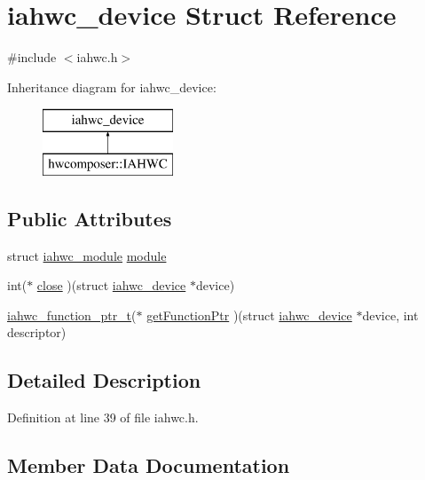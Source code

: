 \hypertarget{structiahwc__device}{}\section{iahwc\+\_\+device Struct Reference}
\label{structiahwc__device}


{\ttfamily \#include $<$iahwc.\+h$>$}

Inheritance diagram for iahwc\+\_\+device\+:\begin{figure}[H]
\begin{center}
\leavevmode
\includegraphics[height=2.000000cm]{structiahwc__device}
\end{center}
\end{figure}
\subsection*{Public Attributes}
\begin{DoxyCompactItemize}
\item 
struct \mbox{\hyperlink{structiahwc__module}{iahwc\+\_\+module}} \mbox{\hyperlink{structiahwc__device_a0aefc811fc58971ae303276df5fec646}{module}}
\item 
int($\ast$ \mbox{\hyperlink{structiahwc__device_a147ff8b5cced2b745222742c89fd3e08}{close}} )(struct \mbox{\hyperlink{structiahwc__device}{iahwc\+\_\+device}} $\ast$device)
\item 
\mbox{\hyperlink{iahwc_8h_a214bf51cce821fdb7b24210088c12cad}{iahwc\+\_\+function\+\_\+ptr\+\_\+t}}($\ast$ \mbox{\hyperlink{structiahwc__device_af5514f45ede1ab95ab6eafa8c3f40ad3}{get\+Function\+Ptr}} )(struct \mbox{\hyperlink{structiahwc__device}{iahwc\+\_\+device}} $\ast$device, int descriptor)
\end{DoxyCompactItemize}


\subsection{Detailed Description}


Definition at line 39 of file iahwc.\+h.



\subsection{Member Data Documentation}
\mbox{\label{structiahwc__device_a147ff8b5cced2b745222742c89fd3e08}} 
